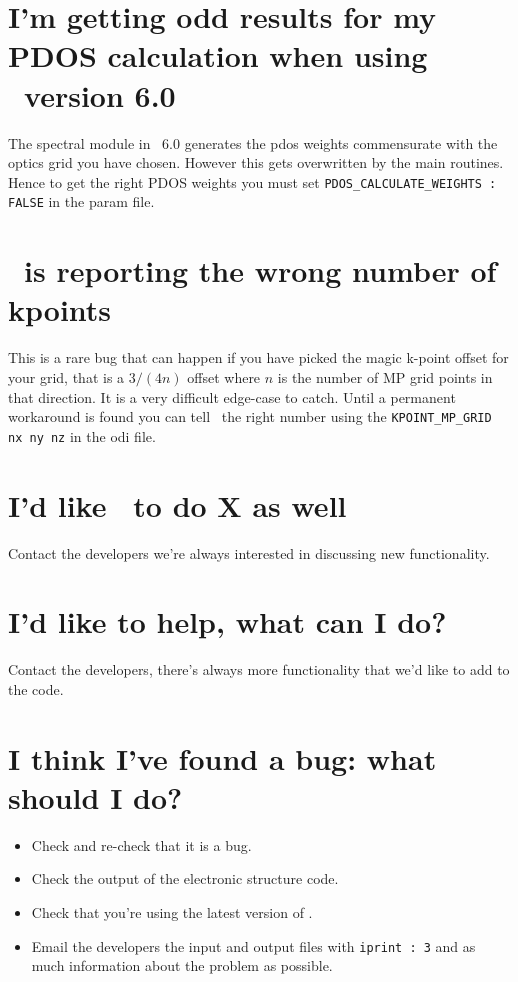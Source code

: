 \documentclass[a4paper,11pt,twoside]{book}
\begin{document}
{\section{I'm getting odd results for my PDOS calculation when using \castep\ version 6.0} \label{pdos_castep_6.0}
The spectral module in \castep\ 6.0 generates the pdos weights commensurate with the optics grid you have chosen. However this gets overwritten by the main routines. Hence to get the right PDOS weights you must set \verb#PDOS_CALCULATE_WEIGHTS : FALSE# in the param file.

\section{\optados\ is reporting the wrong number of kpoints}
This is a rare bug that can happen if you have picked the magic k-point offset for your grid, that is a $3/(4n)$ offset where $n$ is the number of MP grid points in that direction. It is a very difficult edge-case to catch. Until a permanent workaround is found you can tell \optados\ the right number using the \verb#KPOINT_MP_GRID nx ny nz# in the odi file.

\section{I'd like \optados\ to do X as well}
Contact the developers we're always interested in discussing new functionality.

\section{I'd like to help, what can I do?}
Contact the developers, there's always more functionality that we'd
like to add to the code.

\section{I think I've found a bug: what should I do?}
\begin{itemize}
\item Check and re-check that it is a bug.
\item Check the output of the electronic structure code.
\item Check that you're using the latest version of \optados.
\item Email the developers the input and output files with
  \verb#iprint : 3# and as much information about the problem as possible.
\end{itemize}



}
\end{document}
